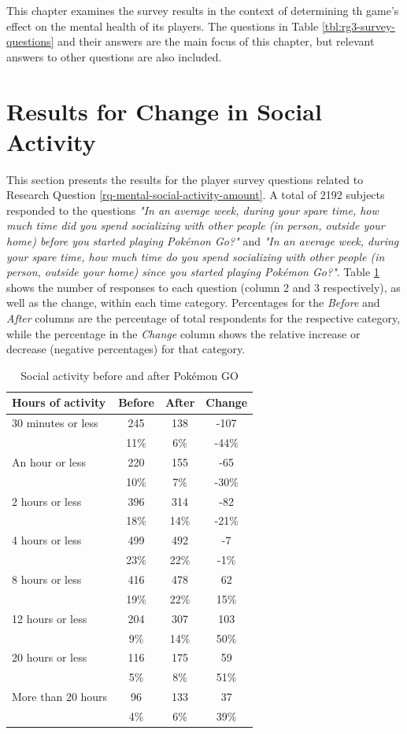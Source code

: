 This chapter examines the survey results in the context of determining th game's effect on the mental health of its players. The questions in Table \ref{tbl:rg3-survey-questions} and their answers are the main focus of this chapter, but relevant answers to other questions are also included.

\section{Results for Change in Social Activity}

This section presents the results for the player survey questions related to Research Question \ref{rq-mental-social-activity-amount}. A total of 2192 subjects responded to the questions \emph{"In an average week, during your spare time, how much time did you spend socializing with other people (in person, outside your home) before you started playing Pokémon Go?"} and \emph{"In an average week, during your spare time, how much time do you spend socializing with other people (in person, outside your home) since you started playing Pokémon Go?"}. Table \ref{tbl:social-activity-before-and-after} shows the number of responses to each question (column 2 and 3 respectively), as well as the change, within each time category. Percentages for the \emph{Before} and \emph{After} columns are the percentage of total respondents for the respective category, while the percentage in the \emph{Change} column shows the relative increase or decrease (negative percentages) for that category.

\begin{table}[h]
	\centering
	\caption{Social activity before and after Pokémon GO}
	\label{tbl:social-activity-before-and-after}
	\begin{tabular}{|l|c|c|c|}
		\hline
		\textbf{Hours of activity} & \textbf{Before} & \textbf{After} & \textbf{Change} \\\hline\hline
		30 minutes or less	& 245 & 138 & -107\\
		& 11\% & 6\% & -44\%\\\hline
		An hour or less & 220 & 155 & -65\\
		& 10\% & 7\% & -30\%\\\hline
		2 hours or less & 396 & 314 & -82\\
		& 18\% & 14\% & -21\%\\\hline
		4 hours or less & 499 & 492 & -7\\
		& 23\% & 22\% & -1\%\\\hline
		8 hours or less & 416 & 478 & 62\\
		& 19\% & 22\% & 15\%\\\hline
		12 hours or less	& 204 & 307 & 103\\
		& 9\% & 14\% & 50\%\\\hline
		20 hours or less	& 116 & 175 & 59\\
		& 5\% & 8\% & 51\%\\\hline
		More than 20 hours	& 96 & 133 & 37\\
		& 4\% & 6\% & 39\%\\\hline
	\end{tabular}
\end{table}

